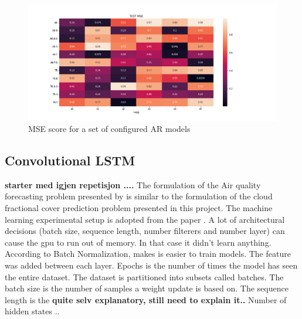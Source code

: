 \begin{figure}
    \centering
    \includegraphics{python_figs/MSE_score_AR_models.png}
    \caption{MSE score for a set of configured AR models}
    \label{fig:results_ar_models}
\end{figure}



\subsection{Convolutional LSTM}
\textbf{starter med igjen repetisjon ....}
The formulation of the Air quality forecasting problem presented by  \citeauthor{SunAirLSTM} is similar to the formulation of the cloud fractional cover prediction problem presented in this project. The machine learning experimental setup is adopted from the paper . 
A lot of architectural decisions (batch size, sequence length, number filterers and number layer) can cause the \acrshort{gpu} to run out of memory. In that case it didn't learn anything. According to  Batch Normalization, makes is easier to train models. The feature was added between each layer. Epochs is the number of times the model has seen the entire dataset. The dataset is partitioned into subsets called batches. The batch size is the number of samples a weight update is based on. The sequence length is the \textbf{quite selv explanatory, still need to explain it.. } Number of hidden states .. 

